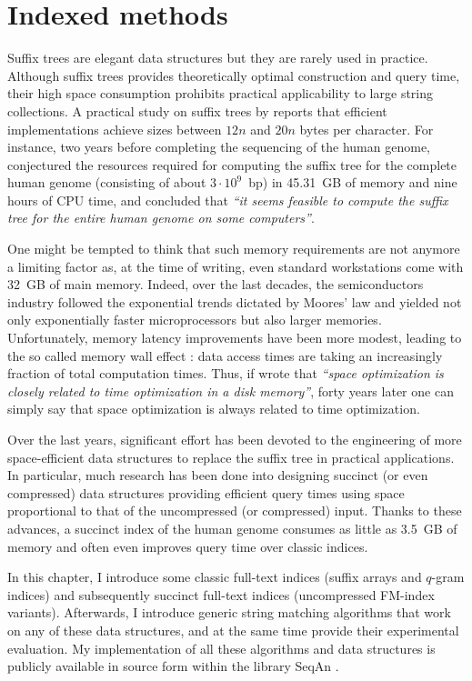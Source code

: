 \chapter{Indexed methods}
\label{chr:index}

Suffix trees are elegant data structures but they are rarely used in practice.
Although suffix trees provides theoretically optimal construction and query time, their high space consumption prohibits practical applicability to large string collections.
A practical study on suffix trees by \cite{Kurtz1999} reports that efficient implementations achieve sizes between $12n$ and $20n$ bytes per character.
For instance, two years before completing the sequencing of the human genome, \citeauthor{Kurtz1999} conjectured the resources required for computing the suffix tree for the complete human genome (consisting of about $3 \cdot 10^9$~bp) in 45.31~GB of memory and nine hours of CPU time, and concluded that \emph{``it seems feasible to compute the suffix tree for the entire human genome on some computers''}.

One might be tempted to think that such memory requirements are not anymore a limiting factor as, at the time of writing, even standard workstations come with 32~GB of main memory.
Indeed, over the last decades, the semiconductors industry followed the exponential trends dictated by Moores' law and yielded not only exponentially faster microprocessors but also larger memories.
Unfortunately, memory latency improvements have been more modest, leading to the so called memory wall effect \citep{Wilkes1995}: data access times are taking an increasingly fraction of total computation times.
Thus, if \cite{Knuth1973} wrote that \emph{``space optimization is closely related to time optimization in a disk memory''}, forty years later one can simply say that space optimization is always related to time optimization.

Over the last years, significant effort has been devoted to the engineering of more space-efficient data structures to replace the suffix tree in practical applications.
In particular, much research has been done into designing succinct (or even compressed) data structures providing efficient query times using space proportional to that of the uncompressed (or compressed) input.
Thanks to these advances, a succinct index of the human genome consumes as little as 3.5~GB of memory and often even improves query time over classic indices.

In this chapter, I introduce some classic full-text indices (suffix arrays and $q$-gram indices) and subsequently succinct full-text indices (uncompressed FM-index variants).
Afterwards, I introduce generic string matching algorithms that work on any of these data structures, and at the same time provide their experimental evaluation.
My implementation of all these algorithms and data structures is publicly available in source form within the \CC library SeqAn \citep{Doering2008}.

